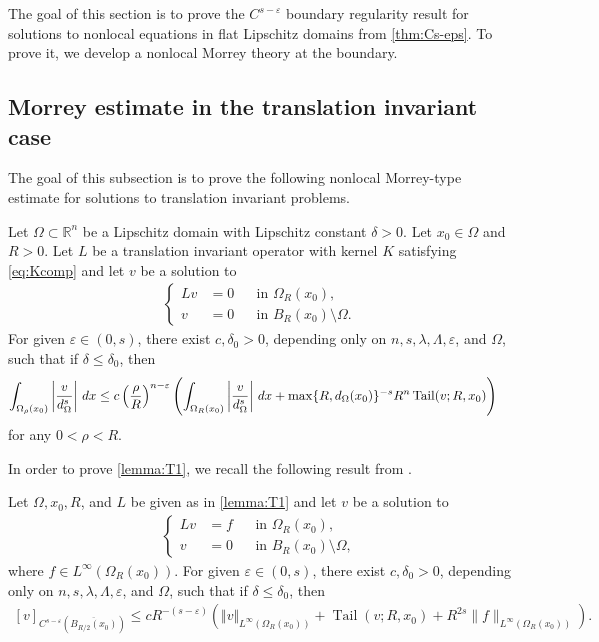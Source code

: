 \documentclass[11pt,reqno]{amsart}
\theoremstyle{plain}
\theoremstyle{definition}
\numberwithin{equation}{section}
\newcommand{\R}{\mathbb{R}}
\newcommand{\eps}{\varepsilon}
\newcommand{\1}{\mathbbm{1}}
\DeclareMathOperator{\tail}{Tail}
\renewcommand{\d}{\textnormal{\,d}}
\begin{document}
The goal of this section is to prove the $C^{s-\eps}$ boundary regularity result for solutions to nonlocal equations in flat Lipschitz domains from \autoref{thm:Cs-eps}. To prove it, we develop a nonlocal Morrey theory at the boundary.



\subsection{Morrey estimate in the translation invariant case}

The goal of this subsection is to prove the following nonlocal Morrey-type estimate for solutions to translation invariant problems.

\begin{lemma}
\label{lemma:T1}
Let $\Omega \subset \R^n$ be a Lipschitz domain with Lipschitz constant $\delta > 0$. Let $x_0 \in \Omega$ and $R>0$. Let $L$ be a translation invariant operator with kernel $K$ satisfying \eqref{eq:Kcomp} and let $v$ be a solution to 
\begin{align*}
\left\{
\begin{aligned}
Lv&=0 &&\text{in }\Omega_R(x_0), \\
v&=0 &&\text{in } B_R(x_0) \setminus \Omega.
\end{aligned}
\right.
\end{align*}
For given $\eps \in (0,s)$, there exist $c, \delta_0 >0$, depending only on $n,s,\lambda,\Lambda,\eps$, and $\Omega$, such that if $\delta \le \delta_0$, then
\begin{align*}
    \int_{\Omega_{\rho}(x_0)} \left|\frac{v}{d_{\Omega}^s} \right| \d x
    &\le c \left( \frac{\rho}{R} \right)^{n-\eps} \left(\int_{\Omega_{R}(x_0)} \left| \frac{v}{d_{\Omega}^s} \right| \d x + \max\{R,d_{\Omega}(x_0)\}^{-s} R^{n} \tail(v; R,x_0) \right)
\end{align*}
for any $0<\rho<R$.
\end{lemma}

In order to prove \autoref{lemma:T1}, we recall the following result from \cite{RoWe24}.

\begin{proposition}
\label{lemma:T2}
Let $\Omega,x_0,R$, and $L$ be given as in \autoref{lemma:T1} and let $v$ be a solution to
\begin{align*}
\left\{
\begin{aligned}
Lv&=f &&\text{in }\Omega_R(x_0), \\
v&=0 &&\text{in } B_R(x_0) \setminus \Omega,
\end{aligned}
\right.
\end{align*}
where $f \in L^\infty(\Omega_R(x_0))$. For given $\eps \in (0,s)$, there exist $c, \delta_0 >0$, depending only on $n,s,\lambda,\Lambda,\eps$, and $\Omega$, such that if $\delta \le \delta_0$, then
\begin{align}\label{eq-T2}
    [ v ]_{C^{s-\eps}(\overline{B_{R/2}(x_0)})} \le c R^{-(s-\eps)} \left( \Vert v \Vert_{L^{\infty}(\Omega_{R}(x_0))} + \tail(v;R,x_0) + R^{2s} \|f\|_{L^\infty(\Omega_R(x_0))} \right).
\end{align}
\end{proposition}
\end{document}
